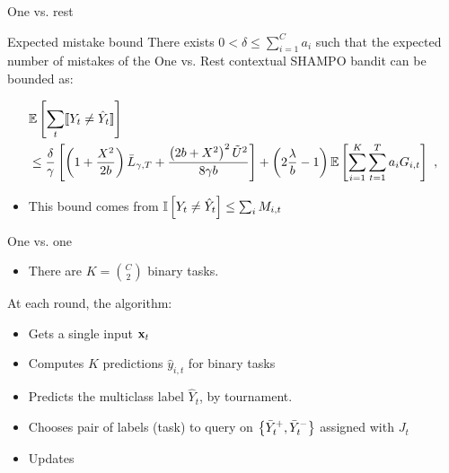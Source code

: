 \documentclass{beamer}
\begin{document}
\begin{frame}{One vs. rest}
\begin{block}{Expected mistake bound}
There exists $0<\delta\le \sum_{i=1}^Ca_{i}$ such that the  expected number of mistakes  of the One vs. Rest contextual SHAMPO bandit  can be bounded as:

 \[
 \begin{split}
 &\mathbb{E}\left[{\sum_t [\![{Y_t \neq \hat{Y}_t}]\!]}\right]\\
 &\le \frac{\delta}{\gamma}\left[{\left(1+\frac{X^2}{2b} \right){\bar L}_{\gamma,T}+
 \frac{\left({2b+X^2}\right)^2\tilde{U}^2}{8{\gamma}b}}\right]
 +\left({2\frac{\lambda}{b}-1}\right)\mathbb{E}\left[{\sum_{i=1}^{K}\sum_{t=1}^{T}{a_{i}G_{i,t}}}\right]~,
 \end{split}
 \]
\end{block}

\begin{itemize}
\item This bound comes from $\mathbb{I}\left[{Y_t \neq \hat{Y}_t}\right]\le \sum_iM_{i,t}$\newline

\end{itemize}
\end{frame}


\begin{frame}{One vs. one}
\begin{itemize}

\item There are $K= {C\choose2}$ binary tasks.\newline

\end{itemize}
At each round, the algorithm:\newline
\begin{itemize}
\item Gets a single input $\mathbf{x}_{t}$\newline
\item Computes $K$ predictions  $\hat{y}_{i,t}$ for binary tasks\newline
\item Predicts the multiclass label $\hat{Y}_t$, by tournament. \newline
\item Chooses pair of labels  (task) to  query on $\left\{{\bar{Y}_t^{+},\bar{Y}_t^{-}}\right\}$ assigned with $J_t$ \newline
\item Updates%
\end{itemize}
\end{frame}
\end{document}
